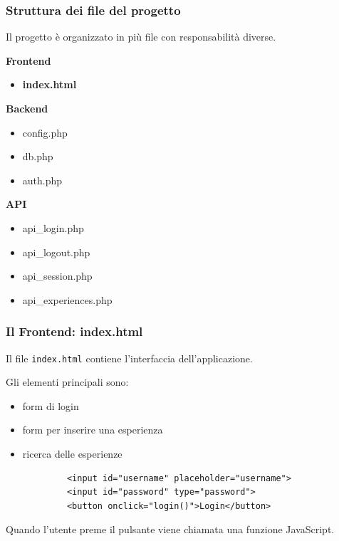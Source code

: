 \documentclass{beamer}
\begin{document}
	
	\begin{frame}
		\frametitle{Struttura dei file del progetto}
		
		Il progetto è organizzato in più file con responsabilità diverse.
		
		\bigskip
		
		\textbf{Frontend}
		
		\begin{itemize}
			\item \textbf{index.html}
		\end{itemize}
		
		\bigskip
		
		\textbf{Backend}
		
		\begin{itemize}
			\item config.php
			\item db.php
			\item auth.php
		\end{itemize}
		
		\bigskip
		
		\textbf{API}
		
		\begin{itemize}
			\item api\_login.php
			\item api\_logout.php
			\item api\_session.php
			\item api\_experiences.php
		\end{itemize}
		
	\end{frame}
	
	
	\begin{frame}[fragile]
		\frametitle{Il Frontend: index.html}
		
		Il file \texttt{index.html} contiene l'interfaccia dell'applicazione.
		
		Gli elementi principali sono:
		
		\begin{itemize}
			\item form di login
			\item form per inserire una esperienza
			\item ricerca delle esperienze
		\end{itemize}
		
		\begin{lstlisting}
			<input id="username" placeholder="username">
			<input id="password" type="password">
			<button onclick="login()">Login</button>
		\end{lstlisting}
		
		Quando l'utente preme il pulsante viene chiamata
		una funzione JavaScript.
		
	\end{frame}
	
\end{document}
